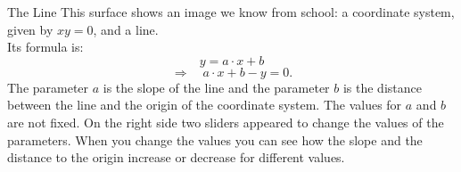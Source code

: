 \begin{surferPage}[Line]{The Line}
This surface shows an image we know from school: a coordinate system, given by  $xy=0$, and a line. \\Its formula is:
\[y=a\cdot x + b\]
\[ \Rightarrow \quad a\cdot x +b -y=0.\]
The parameter $a$ is the slope of the line and the parameter $b$ is the distance between the line and the origin of the coordinate system.
\newline \newline
The values for $a$ and $b$ are not fixed. On the right side two sliders appeared to change the values of the parameters. When you change the values you can see how the slope and the distance to the origin increase or decrease for different values.
\end{surferPage}
